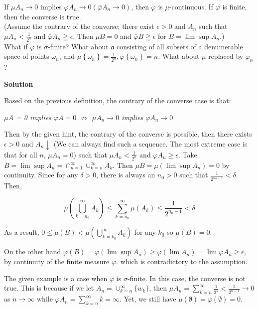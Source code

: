\documentclass[
]{article}
\begin{document}
If \(\mu A_n \rightarrow 0\) implies
\(\varphi A_n \rightarrow 0\left(\bar{\varphi} A_n \rightarrow 0\right)\),
then \(\varphi\) is \(\mu\)-continuous. If \(\varphi\) is finite, then
the converse is true.\\
(Assume the contrary of the converse; there exist \(\epsilon>0\) and
\(A_n\) such that \(\mu A_n<\frac{1}{2^n}\) and
\(\bar{\varphi} A_n \geqq \epsilon\). Then \(\mu B=0\) and
\(\bar{\varphi} B \geqq \epsilon\) for \(B=\lim \sup A_n\).)\\
What if \(\varphi\) is \(\sigma\)-finite? What about \(\mathfrak{a}\)
consisting of all subsets of a denumerable space of points \(\omega_n\),
and
\(\mu\left\{\omega_n\right\}=\frac{1}{2^n}, \varphi\left\{\omega_n\right\}=n\).
What about \(\mu\) replaced by \(\varphi_0\) ?

\textbf{Solution}

Based on the previous definition, the contrary of the converse case is
that:

\emph{\(\mu A\) = 0 implies \(\varphi A = 0\) \(\nRightarrow\)
  \(\mu A_n \rightarrow 0\) implies \(\varphi A_n \rightarrow 0\)}

Then by the given hint, the contrary of the converse is possible, then
there exists \(\epsilon > 0\) and \(A_n \downarrow\) (We can always find
such a sequence. The most extreme case is that for all \(n\),
\(\mu A_n = 0\)) such that \(\mu A_n<\frac{1}{2^n}\) and
\(\varphi A_n \ge \epsilon\). Take
\(B = \lim \sup A_n = \cap_{n=1}^\infty\cup_{k=n}^\infty A_k\). Then
\(\mu B = \mu(\lim \sup A_n ) = 0\) by continuity. Since for any
\(\delta >0\), there is always an \(n_0 > 0\) such that
\(\frac{1}{2^{n_0-1}} < \delta\). Then,

\[\mu\left(\bigcup_{k=n_0}^\infty A_k\right) \le \sum_{k = n_0}^\infty \mu(A_k) \le \frac{1}{2^{n_0-1}} < \delta\]

As a result,
\(0 \le \mu(B) < \mu\left(\bigcup_{k = k_0}^\infty A_k\right)\) for any
\(k_0\) so \(\mu(B) = 0\).

On the other hand
\(\varphi(B) = \varphi(\lim \sup A_n) \ge \varphi(\lim A_n) = \lim \varphi A_n \ge  \epsilon\),
by continuity of the finite measure \(\varphi\). which is contradictory
to the assumption.

The given example is a case when \(\varphi\) is \(\sigma\)-finite. In
this case, the converse is not true. This is because if we let
\(A_n = \cup_{k = n}^\infty \{w_k\}\), then
\(\mu A_n = \sum_{k = n}^\infty \frac{1}{2^k} < \frac{1}{2^{n-1}} \to 0\)
as \(n\to \infty\) while \(\varphi A_n = \sum_{k=n}^\infty k = \infty\).
Yet, we still have \(\mu(\emptyset) = \varphi(\emptyset) = 0\).
\end{document}
